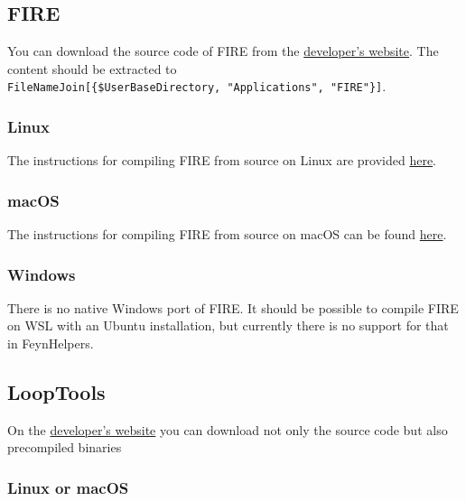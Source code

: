 \documentclass[../FeynHelpersManual.tex]{subfiles}
\begin{document}
\hypertarget{fire}{%
\subsection{FIRE}\label{fire}}

You can download the source code of FIRE from the
\href{https://bitbucket.org/feynmanIntegrals/fire}{developer's website}.
The content should be extracted to
\texttt{FileNameJoin[\allowbreak{}\{\allowbreak{}\$UserBaseDirectory,\ \allowbreak{}"Applications",\ \allowbreak{}"FIRE"\}]}.

\hypertarget{linux-1}{%
\subsubsection{Linux}\label{linux-1}}

The instructions for compiling FIRE from source on Linux are provided
\href{https://bitbucket.org/feynmanIntegrals/fire/src/master/README.md}{here}.

\hypertarget{macos-1}{%
\subsubsection{macOS}\label{macos-1}}

The instructions for compiling FIRE from source on macOS can be found
\href{https://bitbucket.org/feynmanIntegrals/fire/issues/10/issue-of-the-installation-on-macos}{here}.

\hypertarget{windows-1}{%
\subsubsection{Windows}\label{windows-1}}

There is no native Windows port of FIRE. It should be possible to
compile FIRE on WSL with an Ubuntu installation, but currently there is
no support for that in FeynHelpers.

\hypertarget{looptools}{%
\subsection{LoopTools}\label{looptools}}

On the \href{http://www.feynarts.de/looptools/}{developer's website} you
can download not only the source code but also precompiled binaries

\hypertarget{linux-or-macos}{%
\subsubsection{Linux or macOS}\label{linux-or-macos}}
\end{document}
